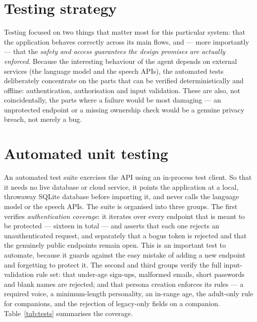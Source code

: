 \documentclass[11pt,a4paper]{report}
\begin{document}
\section{Testing strategy}
Testing focused on two things that matter most for this particular system: that the application behaves correctly across its main flows, and --- more importantly --- that the \emph{safety and access guarantees the design promises are actually enforced}. Because the interesting behaviour of the agent depends on external services (the language model and the speech APIs), the automated tests deliberately concentrate on the parts that can be verified deterministically and offline: authentication, authorisation and input validation. These are also, not coincidentally, the parts where a failure would be most damaging --- an unprotected endpoint or a missing ownership check would be a genuine privacy breach, not merely a bug.

\section{Automated unit testing}
An automated test suite exercises the API using an in-process test client. So that it needs no live database or cloud service, it points the application at a local, throwaway SQLite database before importing it, and never calls the language model or the speech APIs. The suite is organised into three groups. The first verifies \emph{authentication coverage}: it iterates over every endpoint that is meant to be protected --- sixteen in total --- and asserts that each one rejects an unauthenticated request, and separately that a bogus token is rejected and that the genuinely public endpoints remain open. This is an important test to automate, because it guards against the easy mistake of adding a new endpoint and forgetting to protect it. The second and third groups verify the full input-validation rule set: that under-age sign-ups, malformed emails, short passwords and blank names are rejected; and that persona creation enforces its rules --- a required voice, a minimum-length personality, an in-range age, the adult-only rule for companions, and the rejection of legacy-only fields on a companion. Table~\ref{tab:tests} summarises the coverage.
\end{document}
